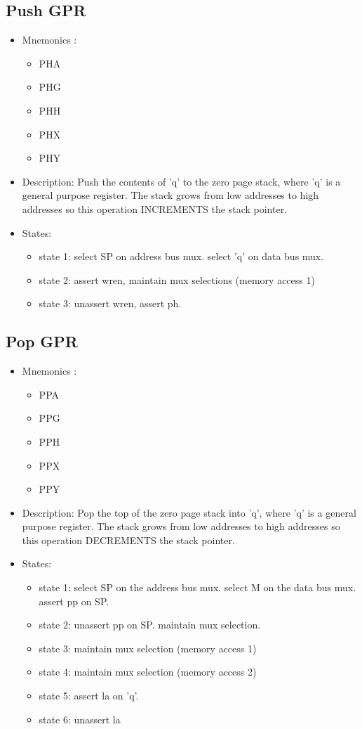 \documentclass[a4paper,12pt]{article}
\begin{document}
\subsection{Push GPR}
\begin{itemize}
\item Mnemonics :
\begin{itemize}
	\item PHA
	\item PHG
	\item PHH
	\item PHX
	\item PHY
\end{itemize}
\item Description: Push the contents of 'q' to the zero page stack, where 'q' is a general purpose register. The stack grows from low addresses to high addresses so this operation INCREMENTS the stack pointer.
\item States:
\begin{itemize}
	\item state 1: select SP on address bus mux. select 'q' on data bus mux.
	\item state 2: assert wren, maintain mux selections (memory access 1)
	\item state 3: unassert wren, assert ph.
\end{itemize}
\end{itemize}

\subsection{Pop GPR}
\begin{itemize}
\item Mnemonics :
\begin{itemize}
	\item PPA
	\item PPG
	\item PPH
	\item PPX
	\item PPY
\end{itemize}
\item Description: Pop the top of the zero page stack into 'q', where 'q' is a general purpose register. The stack grows from low addresses to high addresses so this operation DECREMENTS the stack pointer.
\item States: 
\begin{itemize}
	\item state 1: select SP on the address bus mux. select M on the data bus mux. assert pp on SP.
	\item state 2: unassert pp on SP. maintain mux selection.
	\item state 3: maintain mux selection (memory access 1)
	\item state 4: maintain mux selection (memory access 2)
	\item state 5: assert la on 'q'.
	\item state 6: unassert la
\end{itemize}
\end{itemize}
\end{document}
